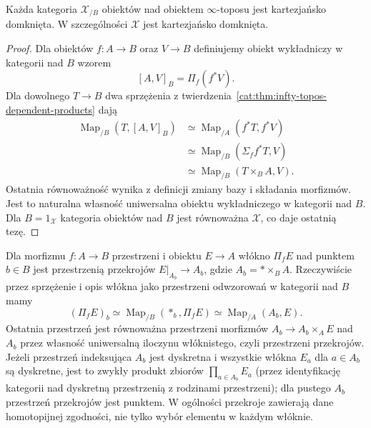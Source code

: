 \begin{wniosek}\label{cat:cor:infty-topos-locally-cartesian-closed}
Każda kategoria $\mathcal X_{/B}$ obiektów nad obiektem $\infty$-toposu jest kartezjańsko domknięta. W szczególności $\mathcal X$ jest kartezjańsko domknięta.
\end{wniosek}
\begin{proof}
Dla obiektów $f:A\to B$ oraz $V\to B$ definiujemy obiekt wykładniczy w kategorii nad $B$ wzorem
\[
 [A,V]_B=\Pi_f(f^*V).
\]
Dla dowolnego $T\to B$ dwa sprzężenia z twierdzenia~\ref{cat:thm:infty-topos-dependent-products} dają
\[
\begin{aligned}
 \operatorname{Map}_{/B}(T,[A,V]_B)
 &\simeq\operatorname{Map}_{/A}(f^*T,f^*V)\\
 &\simeq\operatorname{Map}_{/B}(\Sigma_f f^*T,V)\\
 &\simeq\operatorname{Map}_{/B}(T\times_B A,V).
\end{aligned}
\]
Ostatnia równoważność wynika z definicji zmiany bazy i składania morfizmów. Jest to naturalna własność uniwersalna obiektu wykładniczego w kategorii nad $B$. Dla $B=1_{\mathcal X}$ kategoria obiektów nad $B$ jest równoważna $\mathcal X$, co daje ostatnią tezę.
\end{proof}

\begin{przyklad}\label{cat:ex:infty-dependent-product-spaces}
Dla morfizmu $f:A\to B$ przestrzeni i obiektu $E\to A$ włókno $\Pi_f E$ nad punktem $b\in B$ jest przestrzenią przekrojów $E|_{A_b}\to A_b$, gdzie $A_b=*\times_B A$. Rzeczywiście przez sprzężenie i opis włókna jako przestrzeni odwzorowań w kategorii nad $B$ mamy
\[
 (\Pi_f E)_b\simeq\operatorname{Map}_{/B}(*_b,\Pi_f E)
 \simeq\operatorname{Map}_{/A}(A_b,E).
\]
Ostatnia przestrzeń jest równoważna przestrzeni morfizmów $A_b\to A_b\times_A E$ nad $A_b$ przez własność uniwersalną iloczynu włóknistego, czyli przestrzeni przekrojów. Jeżeli przestrzeń indeksująca $A_b$ jest dyskretna i wszystkie włókna $E_a$ dla $a\in A_b$ są dyskretne, jest to zwykły produkt zbiorów $\prod_{a\in A_b}E_a$ (przez identyfikację kategorii nad dyskretną przestrzenią z rodzinami przestrzeni); dla pustego $A_b$ przestrzeń przekrojów jest punktem. W ogólności przekroje zawierają dane homotopijnej zgodności, nie tylko wybór elementu w każdym włóknie.
\end{przyklad}

